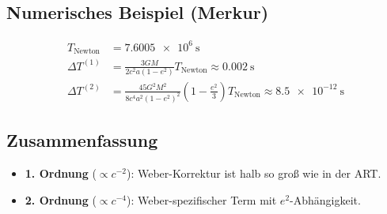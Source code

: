\subsection*{Numerisches Beispiel (Merkur)}
\begin{align*}
T_{\text{Newton}} &= \SI{7.6005e6}{\second} \\
\Delta T^{(1)} &= \frac{3GM}{2c^2a(1-e^2)} T_{\text{Newton}} \approx \SI{0.002}{\second} \\
\Delta T^{(2)} &= \frac{45G^2M^2}{8c^4a^2(1-e^2)^2}\left(1 - \frac{e^2}{3}\right) T_{\text{Newton}} \approx \SI{8.5e-12}{\second}
\end{align*}

\subsection*{Zusammenfassung}
\begin{itemize}
\item \textbf{1. Ordnung} (\(\propto c^{-2}\)): Weber-Korrektur ist halb so groß wie in der ART.
\item \textbf{2. Ordnung} (\(\propto c^{-4}\)): Weber-spezifischer Term mit \(e^2\)-Abhängigkeit.
\end{itemize}
